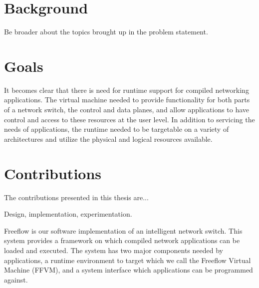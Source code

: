 
\section{Background}
Be broader about the topics brought up in the problem statement.

\section{Goals}
It becomes clear that there is need for runtime support for compiled
networking applications. The virtual machine needed to provide functionality
for both parts of a network switch, the control and data planes, and allow
applications to have control and access to these resources at the user level.
In addition to servicing the needs of applications, the runtime needed to be
targetable on a variety of architectures and utilize the physical and logical
resources available.

\section{Contributions}
The contributions presented in this thesis are...

Design, implementation, experimentation.

Freeflow is our software implementation of an intelligent network switch. This
system provides a framework on which compiled network applications can be
loaded and executed. The system has two major components needed by
applications, a runtime environment to target which we call the Freeflow
Virtual Machine (FFVM), and a system interface which applications can be
programmed against.

